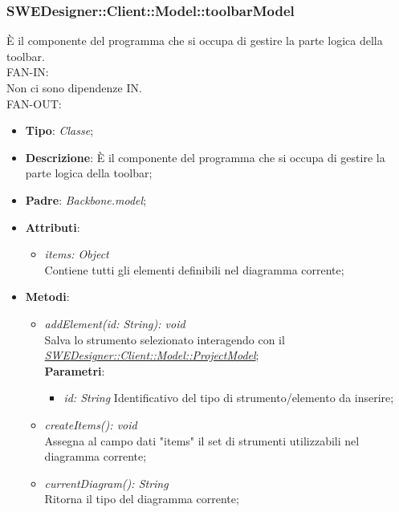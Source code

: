 \documentclass[../DefinizioneDiProdotto.tex]{subfiles}
\begin{document}
				\subsubsection{SWEDesigner::Client::Model::toolbarModel}
				\hypertarget{SWEDesigner::Client::Model::toolbarModel}{}
				È il componente del programma che si occupa di gestire la parte logica della toolbar.\\
					FAN-IN:\\
					Non ci sono dipendenze IN. \\
					FAN-OUT:
					\begin{itemize}
						\item \textbf{Tipo}: \emph{Classe};
						\item \textbf{Descrizione}: È il componente del programma che si occupa di gestire la parte logica della toolbar;
						\item \textbf{Padre}: \emph{Backbone.model};
						\item \textbf{Attributi}:
						\begin{itemize}
							\item \emph{items: Object} \\
							Contiene tutti gli elementi definibili nel diagramma corrente; \\
						\end{itemize}
						\item \textbf{Metodi}:
						\begin{itemize}
							\item \emph{addElement(id: String): void} \\
							Salva lo strumento selezionato interagendo con il \hyperlink{SWEDesigner::Client::Model::ProjectModel}{\emph{SWEDesigner::Client::Model::ProjectModel}}; \\
							\textbf{Parametri}:
							\begin{itemize}
								\item \emph{id: String}
								Identificativo del tipo di strumento/elemento da inserire; \\
							\end{itemize}
							\item \emph{createItems(): void} \\
							Assegna al campo dati "items" il set di strumenti utilizzabili nel diagramma corrente; \\
							\item \emph{currentDiagram(): String} \\
							Ritorna il tipo del diagramma corrente; \\

\end{itemize}
\end{itemize}
\end{document}
